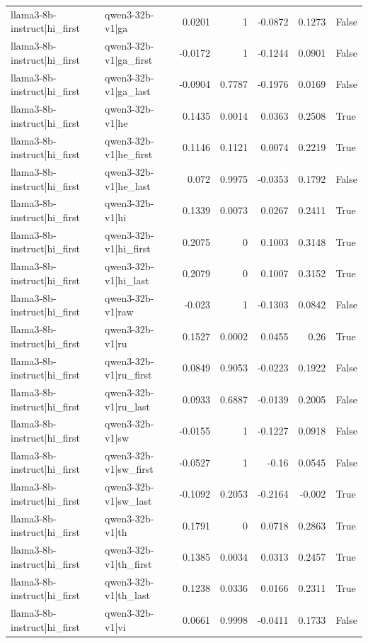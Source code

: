 \begin{table}
\begin{tabular}{l l r r r r l}
llama3-8b-instruct|hi_first & qwen3-32b-v1|ga & 0.0201 & 1 & -0.0872 & 0.1273 & False \\
llama3-8b-instruct|hi_first & qwen3-32b-v1|ga_first & -0.0172 & 1 & -0.1244 & 0.0901 & False \\
llama3-8b-instruct|hi_first & qwen3-32b-v1|ga_last & -0.0904 & 0.7787 & -0.1976 & 0.0169 & False \\
llama3-8b-instruct|hi_first & qwen3-32b-v1|he & 0.1435 & 0.0014 & 0.0363 & 0.2508 & True \\
llama3-8b-instruct|hi_first & qwen3-32b-v1|he_first & 0.1146 & 0.1121 & 0.0074 & 0.2219 & True \\
llama3-8b-instruct|hi_first & qwen3-32b-v1|he_last & 0.072 & 0.9975 & -0.0353 & 0.1792 & False \\
llama3-8b-instruct|hi_first & qwen3-32b-v1|hi & 0.1339 & 0.0073 & 0.0267 & 0.2411 & True \\
llama3-8b-instruct|hi_first & qwen3-32b-v1|hi_first & 0.2075 & 0 & 0.1003 & 0.3148 & True \\
llama3-8b-instruct|hi_first & qwen3-32b-v1|hi_last & 0.2079 & 0 & 0.1007 & 0.3152 & True \\
llama3-8b-instruct|hi_first & qwen3-32b-v1|raw & -0.023 & 1 & -0.1303 & 0.0842 & False \\
llama3-8b-instruct|hi_first & qwen3-32b-v1|ru & 0.1527 & 0.0002 & 0.0455 & 0.26 & True \\
llama3-8b-instruct|hi_first & qwen3-32b-v1|ru_first & 0.0849 & 0.9053 & -0.0223 & 0.1922 & False \\
llama3-8b-instruct|hi_first & qwen3-32b-v1|ru_last & 0.0933 & 0.6887 & -0.0139 & 0.2005 & False \\
llama3-8b-instruct|hi_first & qwen3-32b-v1|sw & -0.0155 & 1 & -0.1227 & 0.0918 & False \\
llama3-8b-instruct|hi_first & qwen3-32b-v1|sw_first & -0.0527 & 1 & -0.16 & 0.0545 & False \\
llama3-8b-instruct|hi_first & qwen3-32b-v1|sw_last & -0.1092 & 0.2053 & -0.2164 & -0.002 & True \\
llama3-8b-instruct|hi_first & qwen3-32b-v1|th & 0.1791 & 0 & 0.0718 & 0.2863 & True \\
llama3-8b-instruct|hi_first & qwen3-32b-v1|th_first & 0.1385 & 0.0034 & 0.0313 & 0.2457 & True \\
llama3-8b-instruct|hi_first & qwen3-32b-v1|th_last & 0.1238 & 0.0336 & 0.0166 & 0.2311 & True \\
llama3-8b-instruct|hi_first & qwen3-32b-v1|vi & 0.0661 & 0.9998 & -0.0411 & 0.1733 & False \\

\end{tabular}
\end{table}
